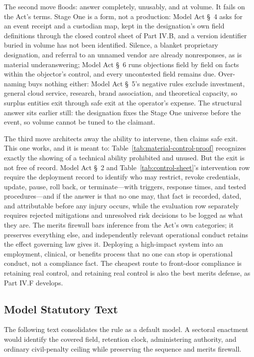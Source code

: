 The second move floods: answer completely, unusably, and at volume. It fails on the Act's terms. Stage One is a form, not a production: Model Act \S~4 asks for an event receipt and a custodian map, kept in the designation's own field definitions through the closed control sheet of Part IV.B, and a version identifier buried in volume has not been identified. Silence, a blanket proprietary designation, and referral to an unnamed vendor are already nonresponses, as is material underanswering; Model Act \S~6 runs objections field by field on facts within the objector's control, and every uncontested field remains due. Over-naming buys nothing either: Model Act \S~5's negative rules exclude investment, general cloud service, research, brand association, and theoretical capacity, so surplus entities exit through safe exit at the operator's expense. The structural answer sits earlier still: the designation fixes the Stage One universe before the event, so volume cannot be tuned to the claimant.

The third move architects away the ability to intervene, then claims safe exit. This one works, and it is meant to: Table~\ref{tab:material-control-proof} recognizes exactly the showing of a technical ability prohibited and unused. But the exit is not free of record. Model Act \S~2 and Table~\ref{tab:control-sheet}'s intervention row require the deployment record to identify who may restrict, revoke credentials, update, pause, roll back, or terminate---with triggers, response times, and tested procedures---and if the answer is that no one may, that fact is recorded, dated, and attributable before any injury occurs, while the evaluation row separately requires rejected mitigations and unresolved risk decisions to be logged as what they are. The merits firewall bars inference from the Act's own categories; it preserves everything else, and independently relevant operational conduct retains the effect governing law gives it. Deploying a high-impact system into an employment, clinical, or benefits process that no one can stop is operational conduct, not a compliance fact. The cheapest route to front-door compliance is retaining real control, and retaining real control is also the best merits defense, as Part IV.F develops.

\subsection{Model Statutory Text}
\label{sec:model-text}

The following text consolidates the rule as a default model. A sectoral enactment would identify the covered field, retention clock, administering authority, and ordinary civil-penalty ceiling while preserving the sequence and merits firewall.

